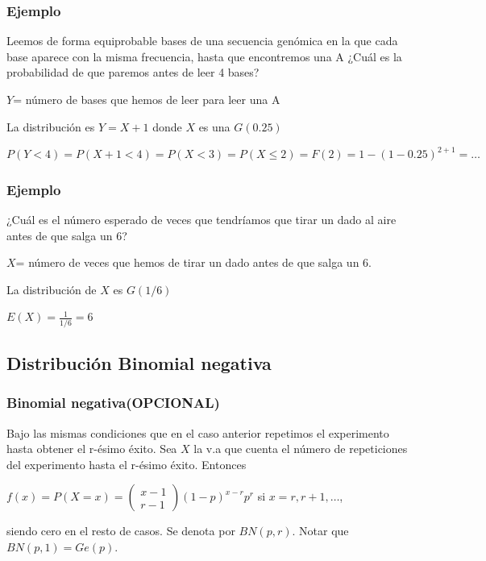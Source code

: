 \begin{frame}
\frametitle{Ejemplo}
Leemos de forma equiprobable bases de una secuencia genómica en la que cada base aparece con la misma frecuencia, hasta que encontremos una A ¿Cuál es la probabilidad de que paremos antes de  leer 4 bases?
\medskip

$Y$= número de bases que hemos de leer para leer una  A
\medskip

La distribución es $Y=X+1$ donde $X$ es una  $G(0.25)$
\medskip 

$P(Y<4)=P(X+1<4)=P(X< 3)=P(X\leq 2)=F(2)= 1-(1-0.25)^{2+1}=\ldots$
\end{frame}




\begin{frame}
\frametitle{Ejemplo}

¿Cuál es el número esperado de veces que tendríamos que tirar un dado al aire antes de que salga un $6$?
\medskip

$X$= número de veces que hemos de tirar un dado antes de que salga un 6.
\medskip\pause

La distribución de $X$ es  $G(1/6)$
\medskip

$E(X)=\frac{1}{1/6}=6$
\end{frame}






\subsection{Distribución  Binomial negativa}

\begin{frame}
    \frametitle{Binomial negativa(\textbf{OPCIONAL})}
    Bajo las mismas condiciones que en el caso anterior repetimos el
     experimento hasta obtener el r-\'esimo \'exito. Sea $X$ la v.a que
     cuenta el n\'umero de repeticiones del experimento hasta el r-\'esimo
     \'exito. Entonces


     $f(x)=P(X=x)=\left(\begin{array}{cc} x-1\\ r-1\end{array}\right)
     (1-p)^{x-r}p^r$ si $x=r,r+1,\ldots$,

     siendo cero en el resto de casos.
     Se denota por $BN(p,r)$. Notar que $BN(p,1)=Ge(p)$.
\end{frame}

